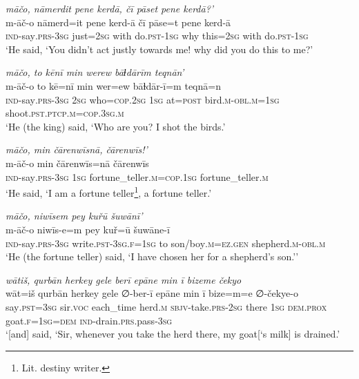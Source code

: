 \ea \label{KŠ.9}
\textit{māčo, nāmerdit pene kerdā, čī pāset pene kerdā?’} \\ 
\gll m-āč-o nāmerd=it pene kerd-ā čī pāse=t pene kerd-ā \\ 
 \textsc{ind-}say\textsc{.prs}\textsc{-3sg} just\textsc{=\textsc{2sg}} with do\textsc{.pst}\textsc{-\textsc{1sg}} why this\textsc{=\textsc{2sg}} with do\textsc{.pst}\textsc{-\textsc{1sg}} \\ 
\glt `He said, ‘You didn’t act justly towards me! why did you do this to me?'
\z 
 
\ea \label{KŠ.10}
\textit{māčo, to kēnī min werew bāɫdārīm teqnān’} \\ 
\gll m-āč-o to kē=nī min wer=ew bāɫdār-ī=m teqnā=n \\ 
 \textsc{ind-}say\textsc{.prs}\textsc{-3sg} \textsc{2sg} who\textsc{=cop}\textsc{.\textsc{2sg}} \textsc{1sg} at\textsc{=\textsc{post}} bird\textsc{.m}\textsc{-obl}\textsc{.m}\textsc{=\textsc{1sg}} shoot\textsc{.pst}\textsc{.ptcp}\textsc{.m}\textsc{=cop}\textsc{.3sg}\textsc{.m} \\ 
\glt `He (the king) said, ‘Who are you? I shot the birds.'
\z 
 
\ea \label{KŠ.11}
\textit{māčo, min čārenwīsnā, čārenwīs!’} \\ 
\gll m-āč-o min čārenwīs=nā čārenwīs \\ 
 \textsc{ind-}say\textsc{.prs}\textsc{-3sg} \textsc{1sg} fortune\_teller\textsc{.m}\textsc{=cop}\textsc{.\textsc{1sg}} fortune\_teller\textsc{.m} \\ 
\glt `He said, ‘I am a fortune teller\footnote{Lit. destiny writer.}, a fortune teller.'
\z 
 
\ea \label{KŠ.13}
\textit{māčo, niwīsem pey kuřū šuwānī’} \\ 
\gll m-āč-o niwīs-e=m pey kuř=ū šuwāne-ī \\ 
 \textsc{ind-}say\textsc{.prs}\textsc{-3sg} write\textsc{.pst}\textsc{-3sg}\textsc{.f}\textsc{=\textsc{1sg}} to son/boy\textsc{.m}\textsc{=ez.gen} shepherd\textsc{.m}\textsc{-obl}\textsc{.m} \\ 
\glt `He (the fortune teller) said, ‘I have chosen her for a shepherd’s son.’'
\z 
 
\ea \label{KŠ.28}
\textit{wātiš, qurbān herkey gele berī epāne min ī bizeme čekyo} \\ 
\gll wāt=iš qurbān herkey gele ∅-ber-ī epāne min ī bize=m=e ∅-čekye-o \\ 
 say\textsc{.pst}\textsc{=3sg} sir.\textsc{voc} each\_time herd\textsc{.m} \textsc{sbjv-}take\textsc{.prs}-\textsc{2sg} there \textsc{1sg} \textsc{dem.prox} goat\textsc{.f}\textsc{=\textsc{1sg}}\textsc{=dem} \textsc{ind-}drain\textsc{.prs}.pass\textsc{-3sg} \\ 
\glt `[and] said, ‘Sir, whenever you take the herd there, my goat[‘s milk] is drained.'
\z 
 
